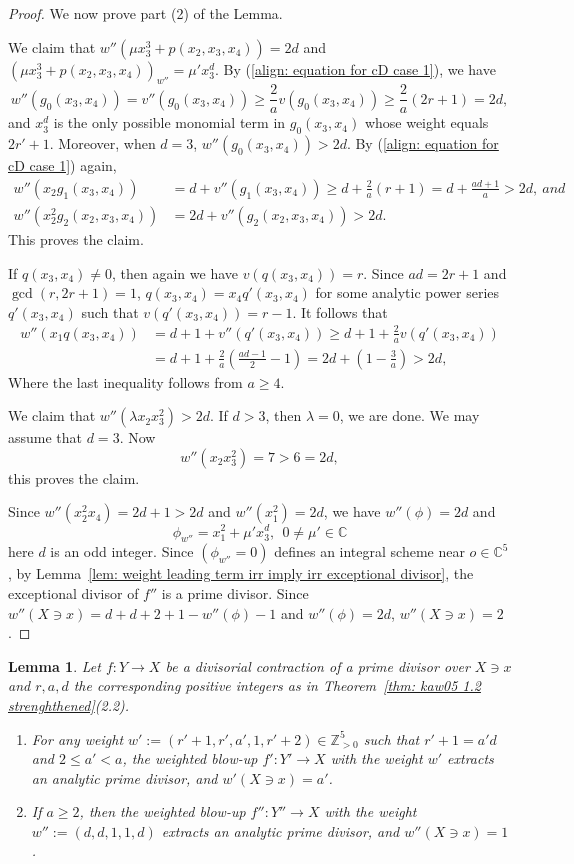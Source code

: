 \documentclass[11pt]{amsart}
\numberwithin{equation}{section}
\newcommand{\Cc}{\mathbb{C}}
\newtheorem{lem}[thm]{Lemma}
\theoremstyle{definition}
\theoremstyle{definition}
\begin{document}
\begin{proof}
\medskip

We now prove part (2) of the Lemma.

We claim that $w''(\mu x_3^3+p(x_2,x_3,x_4))=2d$ and $(\mu x_3^3+p(x_2,x_3,x_4))_{w''}=\mu' x_3^d$. By (\ref{align: equation for cD case 1}), we have $$w''(g_0(x_3,x_4))=v''(g_0(x_3,x_4))\geq \frac{2}{a}v(g_0(x_3,x_4))\geq \frac{2}{a}(2r+1)=2d,$$ and $x_3^{d}$ is the only possible monomial term in $g_0(x_3,x_4)$ whose weight equals $2r'+1$. Moreover, when $d=3$, $w''(g_0(x_3,x_4))>2d$. By (\ref{align: equation for cD case 1}) again, 
\begin{align*}
    w''(x_2g_1(x_3,x_4))&= d+v''(g_1(x_3,x_4))\geq d+\frac{2}{a}(r+1)=d+\frac{ad+1}{a}>2d,\ and\\
    w''(x_2^2g_2(x_2,x_3,x_4))&=2d+v''(g_2(x_2,x_3,x_4))>2d.
\end{align*}
This proves the claim.

If $q(x_3,x_4)\neq 0$, then again we have $v(q(x_3,x_4))=r$. Since $ad=2r+1$ and $\gcd(r,2r+1)=1$, $q(x_3,x_4)=x_4q'(x_3,x_4)$ for some analytic power series $q'(x_3,x_4)$ such that $v(q'(x_3,x_4))=r-1$. It follows that
\begin{align*}
    w''(x_1q(x_3,x_4))&=d+1+v''(q'(x_3,x_4))\geq d+1+\frac{2}{a}v(q'(x_3,x_4))\\
    &=d+1+\frac{2}{a}(\frac{ad-1}{2}-1)=2d+(1-\frac{3}{a})>2d,
\end{align*}
Where the last inequality follows from $a\geq 4$.

We claim that $w''(\lambda x_2x_3^2)>2d$. If $d>3$, then $\lambda =0$, we are done. We may assume that $d=3$. Now $$w''(x_2x_3^2)=7>6=2d,$$ this proves the claim.

Since $w''(x_2^2x_4)=2d+1>2d$ and $w''(x_1^2)=2d$, we have $w''(\phi)=2d$ and $$\phi_{w''}=x_1^2+\mu'x_3^d,\ \ 0\neq \mu'\in \Cc$$ here $d$ is an odd integer. Since $(\phi_{w''}=0)$ defines an integral scheme near $o\in \Cc^5$, by Lemma~\ref{lem: weight leading term irr imply irr exceptional divisor}, the exceptional divisor of $f''$ is a prime divisor. Since $w''(X\ni x)=d+d+2+1-w''(\phi)-1$ and $w''(\phi)=2d$, $w''(X\ni x)=2$.
\end{proof}

\begin{lem}\label{lem: cD irreducible case 2}
Let $f: Y\to X$ be a divisorial contraction of a prime divisor over $X\ni x$ and $r,a,d$ the corresponding positive integers as in Theorem~\ref{thm: kaw05 1.2 strenghthened}(2.2).
\begin{enumerate}
    \item For any weight $w':=(r'+1,r',a',1,r'+2)\in\mathbb Z_{>0}^5$ such that $r'+1=a'd$ and $2\leq a'<a$, the weighted blow-up $f':Y'\to X$ with the weight $w'$ extracts an analytic prime divisor, and $w'(X\ni x)=a'$. 
    \item If $a\geq 2$, then the weighted blow-up $f'':Y''\to X$ with the weight $w'':=(d,d,1,1,d)$ extracts an analytic prime divisor, and $w''(X\ni x)=1$. 
\end{enumerate}
\end{lem}
\end{document}
